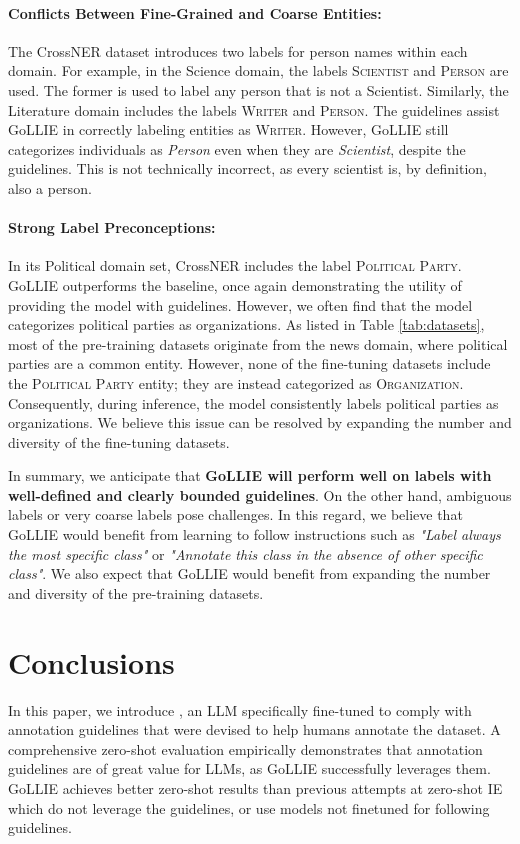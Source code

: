 \paragraph{Conflicts Between Fine-Grained and Coarse Entities:} The CrossNER dataset introduces two labels for person names within each domain. For example, in the Science domain, the labels \textsc{Scientist} and \textsc{Person} are used. The former is used to label any person that is not a Scientist. Similarly, the Literature domain includes the labels \textsc{Writer} and \textsc{Person}. The guidelines assist GoLLIE in correctly labeling entities as \textsc{Writer}. However, GoLLIE still categorizes individuals as \textit{Person} even when they are \textit{Scientist}, despite the guidelines. This is not technically incorrect, as every scientist is, by definition, also a person. 

\paragraph{Strong Label Preconceptions:} In its Political domain set, CrossNER includes the label \textsc{Political Party}. GoLLIE outperforms the baseline, once again demonstrating the utility of providing the model with guidelines. However, we often find that the model categorizes political parties as organizations. As listed in Table \ref{tab:datasets}, most of the pre-training datasets originate from the news domain, where political parties are a common entity. However, none of the fine-tuning datasets include the \textsc{Political Party} entity; they are instead categorized as \textsc{Organization}. Consequently, during inference, the model consistently labels political parties as organizations. We believe this issue can be resolved by expanding the number and diversity of the fine-tuning datasets.

In summary, we anticipate that \textbf{GoLLIE will perform well on labels with well-defined and clearly bounded guidelines}. On the other hand, ambiguous labels or very coarse labels pose challenges. In this regard, we believe that GoLLIE would benefit from learning to follow instructions such as \textit{"Label always the most specific class"} or \textit{"Annotate this class in the absence of other specific class"}. We also expect that GoLLIE would benefit from expanding the number and diversity of the pre-training datasets.

\section{Conclusions}
In this paper, we introduce \GoLLIET, an LLM specifically fine-tuned to comply with annotation guidelines that were devised to help humans annotate the dataset. A comprehensive zero-shot evaluation empirically demonstrates that annotation guidelines are of great value for LLMs, as GoLLIE successfully leverages them. GoLLIE achieves better zero-shot results than previous attempts at zero-shot IE which do not leverage the guidelines, or use models not finetuned for following guidelines. 

